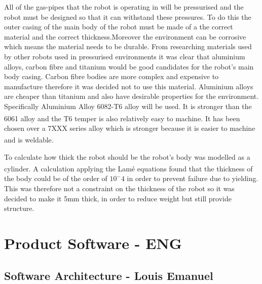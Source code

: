 \documentclass[11pt]{article}		%
\newcommand{\supercite}[1]{\textsuperscript{\cite{#1}}}		%
\begin{document}
			
			All of the gas-pipes that the robot is operating in will be pressurised and the robot must be designed so that it can withstand these pressures. To do this the outer casing of the main body of the robot must be made of a the correct material and the correct thickness.Moreover the environment can be corrosive which means the material needs to be durable.
		    From researching materials used by other robots used in pressurised environments it was clear that aluminium alloys, carbon fibre and titanium would be good candidates for the robot’s main body casing. Carbon fibre bodies are more complex and expensive to manufacture therefore it was decided not to use this material. Aluminium alloys are cheaper than titanium and also have desirable properties for the environment.
		    Specifically Aluminium Alloy 6082-T6 alloy will be used. It is stronger than the 6061 alloy and the T6 temper is also relatively easy to machine.\supercite{Aluminium_Alloys}  It has been chosen over a 7XXX series alloy which is stronger because it is easier to machine and is weldable. \supercite{Aluminium_Alloys_differences}
		    
		   To calculate how thick the robot should be the robot's body was modelled as a cylinder. A calculation applying the Lamé equations \supercite{lame} found that the thickness of the body could be of the order of $10^-4$ in order to prevent failure due to yielding. This was therefore not a constraint on the thickness of the robot so it was decided to make it 5mm thick, in order to reduce weight but still provide structure.
	
	\section{Product Software - ENG}
		\subsection[Software Architecture] {Software Architecture - Louis Emanuel}
        
\end{document}
